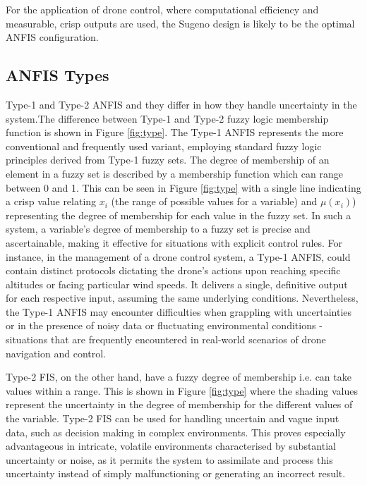 For the application of drone control, where computational efficiency and measurable, crisp outputs are used, the Sugeno design is likely to be the optimal ANFIS configuration. 

\subsection{ANFIS Types}
Type-1 and Type-2 ANFIS and they differ in how they handle uncertainty in the system.The difference between Type-1 and Type-2 fuzzy logic membership function is shown in Figure \ref{fig:type}.
The Type-1 ANFIS represents the more conventional and frequently used variant, employing standard fuzzy logic principles derived from Type-1 fuzzy sets. The degree of membership of an element in a fuzzy set is described by a membership function which can range between 0 and 1. This can be seen in Figure \ref{fig:type} with a single line indicating a crisp value relating $x_i$ (the range of possible values for a variable) and $\mu(x_i)$) representing the degree of membership for each value in the fuzzy set. In such a system, a variable's degree of membership to a fuzzy set is precise and ascertainable, making it effective for situations with explicit control rules. For instance, in the management of a drone control system, a Type-1 ANFIS, could contain distinct protocols dictating the drone's actions upon reaching specific altitudes or facing particular wind speeds. It delivers a single, definitive output for each respective input, assuming the same underlying conditions. Nevertheless, the Type-1 ANFIS may encounter difficulties when grappling with uncertainties or in the presence of noisy data or fluctuating environmental conditions - situations that are frequently encountered in real-world scenarios of drone navigation and control.

Type-2 FIS, on the other hand, have a fuzzy degree of membership i.e. can take values within a range. This is shown in Figure \ref{fig:type} where the shading values represent the uncertainty in the degree of membership for the different values of the variable. Type-2 FIS can be used for handling uncertain and vague input data, such as decision making in complex environments. This proves especially advantageous in intricate, volatile environments characterised by substantial uncertainty or noise, as it permits the system to assimilate and process this uncertainty instead of simply malfunctioning or generating an incorrect result.

